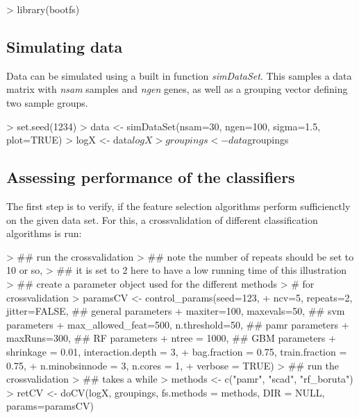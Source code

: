 \documentclass[11pt,a4paper]{article}
\begin{document}
\begin{Schunk}
\begin{Sinput}
> library(bootfs)
\end{Sinput}
\end{Schunk}


\subsection{Simulating data}
Data can be simulated using a built in function \emph{simDataSet}. This samples a data matrix with \emph{nsam} samples and \emph{ngen} genes, as well as a grouping vector defining two sample groups.

\begin{Schunk}
\begin{Sinput}
> set.seed(1234)
> data <- simDataSet(nsam=30, ngen=100, sigma=1.5, plot=TRUE)
> logX <- data$logX
> groupings <- data$groupings
\end{Sinput}
\end{Schunk}

\subsection{Assessing performance of the classifiers}

The first step is to verify, if the feature selection algorithms perform sufficienctly on the given data set. For this, a crossvalidation of different classification algorithms is run:

\begin{Schunk}
\begin{Sinput}
> ## run the crossvalidation
> ## note the number of repeats should be set to 10 or so, 
> ## it is set to 2 here to have a low running time of this illustration
> ## create a parameter object used for the different methods
> # for crossvalidation
> paramsCV <- control_params(seed=123,
+  ncv=5, repeats=2, jitter=FALSE,      ## general parameters
+  maxiter=100, maxevals=50,             ## svm parameters
+  max_allowed_feat=500, n.threshold=50, ## pamr parameters
+  maxRuns=300,                          ## RF parameters
+  ntree = 1000,                         ## GBM parameters
+  shrinkage = 0.01, interaction.depth = 3,
+  bag.fraction = 0.75, train.fraction = 0.75, 
+  n.minobsinnode = 3, n.cores = 1, 
+  verbose = TRUE)
> ## run the crossvalidation
> ## takes a while
> methods <- c("pamr", "scad", "rf_boruta")
> retCV <- doCV(logX, groupings, fs.methods = methods, DIR = NULL, params=paramsCV)
\end{Sinput}
\end{Schunk}
\end{document}
